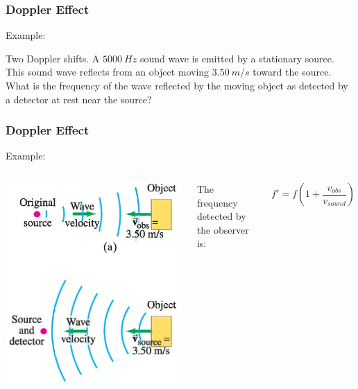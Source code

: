 \documentclass[]{beamer}
\begin{document}

\begin{frame}
\frametitle{Doppler Effect}

Example: 

\vspace{3mm}

Two Doppler shifts. A $5000~Hz$ sound wave is emitted by a
stationary source. This sound wave reflects from an object moving $3.50~m/s$
toward the source. What is the frequency of the wave reflected by
the moving object as detected by a detector at rest near the source?




  \end{frame}




\begin{frame}
\frametitle{Doppler Effect}

Example: 

\vspace{3mm}

   \begin{columns}[c]
   \column{2in}  %
  \begin{center}
  \includegraphics[height=2.in]{images4/doppler7.jpg}
\end{center}


  
   \column{2in}
\pause
The frequency detected by the observer is:

\begin{equation*}
f'= f\left(1+\frac{v_{obs}}{v_{sound}}\right)
\end{equation*}




   \end{columns}




  \end{frame}
\end{document}
